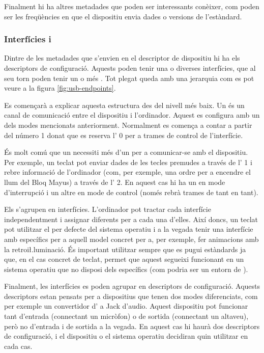 Finalment hi ha altres metadades que poden ser interessants conèixer, com
poden ser les freqüències en que el dispositiu envia dades o versions de
l'estàndard.

\subsubsection*{Interfícies i }

Dintre de les metadades que s'envien en el descriptor de dispositiu hi ha els
descriptors de configuració. Aquests poden tenir una o diverses interfícies, que
al seu torn poden tenir un o més . Tot plegat queda amb una
jerarquia com es pot veure a la figura \ref{fig:usb-endpoints}.



Es començarà a explicar aquesta estructura des del nivell més baix. Un
 és un canal de comunicació entre el dispositiu i l'ordinador.
Aquest es configura amb un dels modes mencionats anteriorment. Normalment es
comença a contar a partir del número 1 donat que es reserva l'
0 per a trames de control de l'interfície.

És molt comú que un  necessiti més d'un  per
a comunicar-se amb el dispositiu. Per exemple, un teclat pot enviar dades de les
tecles premudes a través de l' 1 i rebre informació de l'ordinador
(com, per exemple, una ordre per a encendre el llum del Bloq Mayus) a través de
l' 2. En aquest cas hi ha un  en mode d'interrupció
i un altre en mode de control (només rebrà trames  de tant en tant).

Els  s'agrupen en interfícies. L'ordinador pot tractar cada
interfície independentment i assignar diferents  per a cada una
d'elles. Així doncs, un teclat pot utilitzar el  per defecte del
sistema operatiu i a la vegada tenir una interfície amb  específics
per a aquell model concret per a, per exemple, fer animacions amb la
retroi\l.luminació. És important utilitzar sempre que es pugui 
estàndards ja que, en el cas concret de teclat, permet que aquest segueixi
funcionant en un sistema operatiu que no disposi dels 
específics (com podria ser un entorn de ).

Finalment, les interfícies es poden agrupar en descriptors de configuració.
Aquests descriptors estan pensats per a dispositius que tenen dos modes
diferenciats, com per exemple un convertidor d' a Jack d'audio. Aquest
dispositiu pot funcionar tant d'entrada (connectant un micròfon) o de sortida
(connectant un altaveu), però no d'entrada i de sortida a la vegada. En aquest
cas hi haurà dos descriptors de configuració, i el dispositiu o el sistema
operatiu decidiran quin utilitzar en cada cas.

